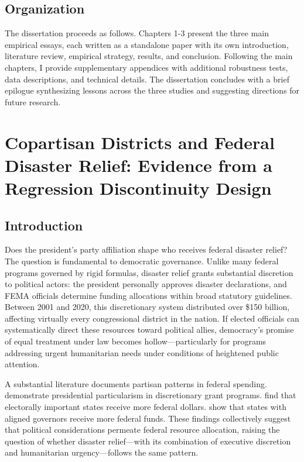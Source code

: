 \documentclass[12pt,letterpaper,oneside]{book}
\newcommand{\mychapter}[1]{
    \chapter{#1}
    \doublespacing
}
\begin{document}
\section*{Organization}

The dissertation proceeds as follows. Chapters 1-3 present the three main empirical essays, each written as a standalone paper with its own introduction, literature review, empirical strategy, results, and conclusion. Following the main chapters, I provide supplementary appendices with additional robustness tests, data descriptions, and technical details. The dissertation concludes with a brief epilogue synthesizing lessons across the three studies and suggesting directions for future research.


\mychapter{Copartisan Districts and Federal Disaster Relief: Evidence from a Regression Discontinuity Design}

\section{Introduction}

Does the president's party affiliation shape who receives federal disaster relief? The question is fundamental to democratic governance. Unlike many federal programs governed by rigid formulas, disaster relief grants substantial discretion to political actors: the president personally approves disaster declarations, and FEMA officials determine funding allocations within broad statutory guidelines. Between 2001 and 2020, this discretionary system distributed over \$150 billion, affecting virtually every congressional district in the nation. If elected officials can systematically direct these resources toward political allies, democracy's promise of equal treatment under law becomes hollow---particularly for programs addressing urgent humanitarian needs under conditions of heightened public attention.

A substantial literature documents partisan patterns in federal spending. \cite{berry2010presidents} demonstrate presidential particularism in discretionary grant programs. \cite{kriner2015particularistic} find that electorally important states receive more federal dollars. \cite{larcinese2006allocating} show that states with aligned governors receive more federal funds. These findings collectively suggest that political considerations permeate federal resource allocation, raising the question of whether disaster relief---with its combination of executive discretion and humanitarian urgency---follows the same pattern.
\end{document}
